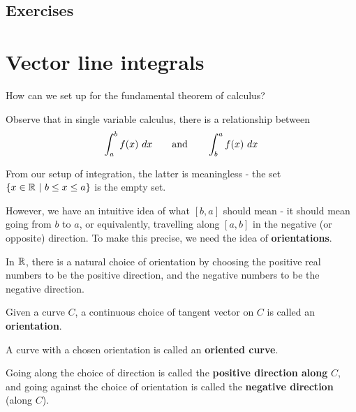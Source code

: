 \subsection{Exercises}


\section{Vector line integrals}


\begin{motivating}
    How can we set up for the fundamental theorem of calculus?
\end{motivating}


\begin{remark}
        Observe that in single variable calculus, there is a relationship between
        $$\int_a^b f(x) \ dx \qquad \textnormal{and} \qquad \int_b^a f(x) \ dx$$

From our setup of integration, the latter is meaningless - the set $\{x \in \mathbb{R} \ | \ b  \leq x \leq a\}$ is the empty set.
    
    \vspace{.5em}
    
    However, we have an intuitive idea of what $[b,a]$ should mean - it should mean going from $b$ to $a$, or equivalently, travelling along $[a,b]$ in the negative (or opposite) direction.  To make this precise, we need the idea of \textbf{orientations}.

        \end{remark}

In $\mathbb{R}$, there is a natural choice of orientation by choosing the positive real numbers to be the positive direction, and the negative numbers to be the negative direction.

\begin{definition}
    Given a curve $C$, a continuous choice of tangent vector on $C$ is called an \textbf{orientation}.
    
    \vspace{.5em}
    
    A curve with a chosen orientation is called an \textbf{oriented curve}.
    
    
    
    \vspace{.5em}
    
    Going along the choice of direction is called the \textbf{positive direction along} $C$, and going against the choice of orientation is called the \textbf{negative direction} (along $C$).
    \end{definition}








